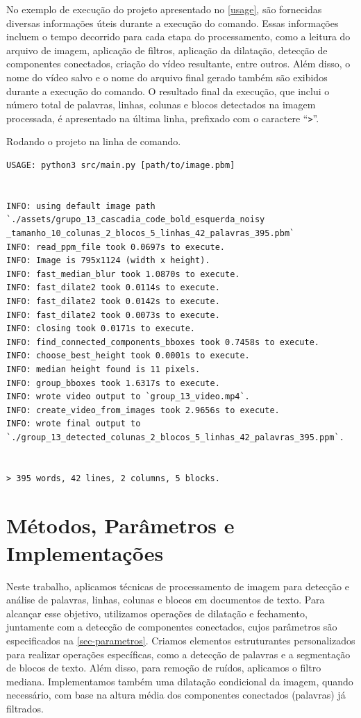 \documentclass[english, 
               brazil, 
               bsc] %
               {dcomp-abntex2}
\begin{document}
No exemplo de execução do projeto apresentado no \autoref{usage}, são fornecidas diversas informações úteis durante a execução do comando. Essas informações incluem o tempo decorrido para cada etapa do processamento, como a leitura do arquivo de imagem, aplicação de filtros, aplicação da dilatação, detecção de componentes conectados, criação do vídeo resultante, entre outros. Além disso, o nome do vídeo salvo e o nome do arquivo final gerado também são exibidos durante a execução do comando. O resultado final da execução, que inclui o número total de palavras, linhas, colunas e blocos detectados na imagem processada, é apresentado na última linha, prefixado com o caractere ``\texttt{>}''.


\begin{codigo}[h]
  \caption{\small Rodando o projeto na linha de comando.}
 \label{usage}
\begin{lstlisting}
USAGE: python3 src/main.py [path/to/image.pbm]


INFO: using default image path `./assets/grupo_13_cascadia_code_bold_esquerda_noisy
_tamanho_10_colunas_2_blocos_5_linhas_42_palavras_395.pbm`
INFO: read_ppm_file took 0.0697s to execute.
INFO: Image is 795x1124 (width x height).
INFO: fast_median_blur took 1.0870s to execute.
INFO: fast_dilate2 took 0.0114s to execute.
INFO: fast_dilate2 took 0.0142s to execute.
INFO: fast_dilate2 took 0.0073s to execute.
INFO: closing took 0.0171s to execute.
INFO: find_connected_components_bboxes took 0.7458s to execute.
INFO: choose_best_height took 0.0001s to execute.
INFO: median height found is 11 pixels.
INFO: group_bboxes took 1.6317s to execute.
INFO: wrote video output to `group_13_video.mp4`.
INFO: create_video_from_images took 2.9656s to execute.
INFO: wrote final output to `./group_13_detected_colunas_2_blocos_5_linhas_42_palavras_395.ppm`.


> 395 words, 42 lines, 2 columns, 5 blocks.
\end{lstlisting}
\end{codigo}




\chapter{Métodos, Parâmetros e Implementações}\label{ch-detalhes}


Neste trabalho, aplicamos técnicas de processamento de imagem para detecção e análise de palavras, linhas, colunas e blocos em documentos de texto. Para alcançar esse objetivo, utilizamos operações de dilatação e fechamento, juntamente com a detecção de componentes conectados, cujos parâmetros são especificados na \autoref{sec-parametros}. Criamos elementos estruturantes personalizados para realizar operações específicas, como a detecção de palavras e a segmentação de blocos de texto. Além disso, para remoção de ruídos, aplicamos o filtro mediana. Implementamos também uma dilatação condicional da imagem, quando necessário, com base na altura média dos componentes conectados (palavras) já filtrados.
\end{document}
